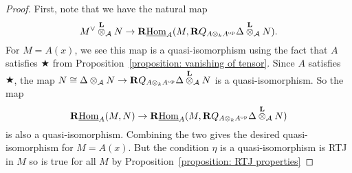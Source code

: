 \begin{proof}
  First, note that we have the natural map 
  \begin{displaymath}
    M^\vee \overset{\mathbf{L}}{\otimes}_{\mathcal A} N \to \mathbf{R}\underline{\operatorname{Hom}}_A(M, \mathbf{R}Q_{A \otimes_k A^{\operatorname{op}}} \Delta \overset{\mathbf{L}}{\otimes}_{\mathcal A} N).
  \end{displaymath}
  For \(M = A(x)\), we see this map is a quasi-isomorphism using the fact that \(A\) satisfies \(\bigstar\) from Proposition~\ref{proposition: vanishing of tensor}. 
  Since \(A\) satisfies \(\bigstar\), the map \(N \cong \Delta \otimes_{\mathcal A} N \to \mathbf{R}Q_{A \otimes_k A^{\operatorname{op}}} \Delta \overset{\mathbf{L}}{\otimes}_{\mathcal A} N\) is a quasi-isomorphism. So the map  
  \begin{displaymath}
    \mathbf{R}\underline{\operatorname{Hom}}_A(M, N) \to \mathbf{R}\underline{\operatorname{Hom}}_A(M, \mathbf{R}Q_{A \otimes_k A^{\operatorname{op}}} \Delta \overset{\mathbf{L}}{\otimes}_{\mathcal A} N)
  \end{displaymath}
  is also a quasi-isomorphism. Combining the two gives the desired quasi-isomorphism for \(M = A(x)\). But the condition \(\eta\) is a quasi-isomorphism is RTJ in \(M\) so is true for all \(M\) by Proposition~\ref{proposition: RTJ properties}
\end{proof}

